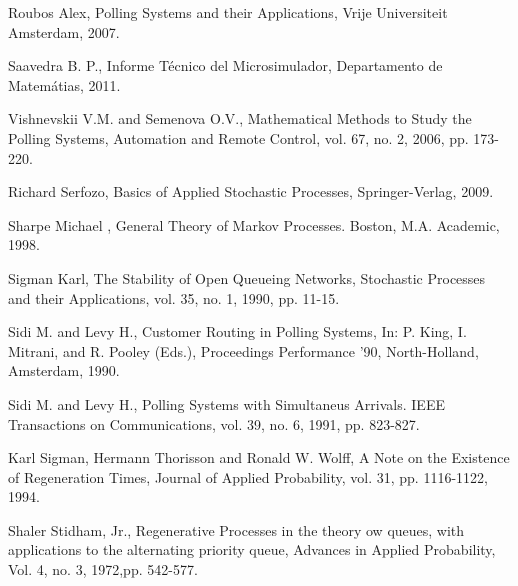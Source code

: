 \begin{thebibliography}{99}
Roubos Alex, Polling Systems and their Applications, Vrije
Universiteit Amsterdam, 2007.



Saavedra B. P., Informe T\'ecnico del Microsimulador, Departamento
de Matem\'atias, 2011.

Vishnevskii V.M. and Semenova O.V., Mathematical Methods to Study the Polling Systems, Automation and Remote Control, vol. 67, no. 2, 2006, pp. 173-220.

 Richard Serfozo, Basics of Applied Stochastic Processes, Springer-Verlag, 2009.


 Sharpe Michael , General Theory of Markov Processes. Boston, M.A.
Academic, 1998.


 Sigman Karl, The Stability of Open Queueing
Networks, Stochastic Processes and their Applications, vol. 35,
no. 1, 1990, pp. 11-15.

 Sidi M.  and Levy H.,  Customer Routing in Polling Systems, In: P. King, I. Mitrani, and R. Pooley (Eds.), Proceedings
Performance '90, North-Holland, Amsterdam, 1990.


 Sidi M.  and Levy H., Polling Systems with Simultaneus Arrivals. IEEE Transactions on Communications, vol. 39, no. 6, 1991, pp.
823-827.

 Karl Sigman, Hermann Thorisson and Ronald W. Wolff, A Note on the Existence of Regeneration Times, Journal of Applied Probability, vol. 31, pp. 1116-1122, 1994.



 Shaler Stidham, Jr., Regenerative Processes in the theory ow queues, with applications to the alternating priority queue, Advances in Applied Probability,  Vol. 4, no. 3, 1972,pp. 542-577.




\end{thebibliography}
